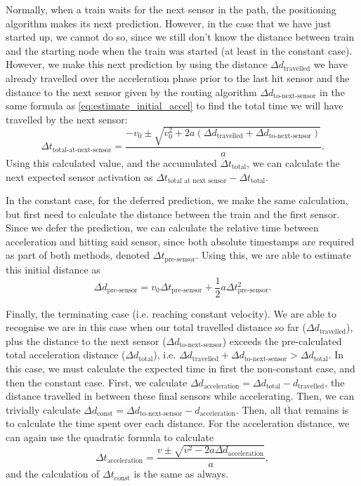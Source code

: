 \documentclass[12pt, titlepage]{article}
\begin{document}
    Normally, when a train waits for the next sensor in the path, the positioning algorithm makes its next prediction. However, in the case that we have just started up, we cannot do so, since we still don't know the distance between train and the starting node when the train was started (at least in the constant case). However, we make this next prediction by using the distance $\Delta d_\text{travelled}$ we have already travelled over the acceleration phase prior to the last hit sensor and the distance to the next sensor given by the routing algorithm $\Delta d_\text{to-next-sensor}$ in the same formula as \eqref{eq:estimate_initial_accel} to find the total time we will have travelled by the next sensor:
    \[
        \Delta t_\text{total-at-next-sensor} = \frac{-v_0 \pm \sqrt{v_0^2 + 2a(\Delta d_\text{travelled} + \Delta d_\text{to-next-sensor})}}{a}.
    \]
    Using this calculated value, and the accumulated $\Delta t_\text{total}$, we can calculate the next expected sensor activation as $\Delta t_\text{total at next sensor} - \Delta t_\text{total}$.
    
    In the constant case, for the deferred prediction, we make the same calculation, but first need to calculate the distance between the train and the first sensor. Since we defer the prediction, we can calculate the relative time between acceleration and hitting said sensor, since both absolute timestamps are required as part of both methods, denoted $\Delta t_\text{pre-sensor}$. Using this, we are able to estimate this initial distance as
    \[
        \Delta d_\text{pre-sensor} = v_0 \Delta t_\text{pre-sensor} + \frac{1}{2} a \Delta t_\text{pre-sensor}^2.
    \]
    
    Finally, the terminating case (i.e. reaching constant velocity). We are able to recognise we are in this case when our total travelled distance so far ($\Delta d_\text{travelled}$), plus the distance to the next sensor ($\Delta d_\text{to-next-sensor}$) exceeds the pre-calculated total acceleration distance ($\Delta d_\text{total}$), i.e. $\Delta d_\text{travelled} + \Delta d_\text{to-next-sensor} > \Delta d_\text{total}$. In this case, we must calculate the expected time in first the non-constant case, and then the constant case. First, we calculate $\Delta d_\text{acceleration} = \Delta d_\text{total} - d_\text{travelled}$, the distance travelled in between these final sensors while accelerating. Then, we can trivially calculate $\Delta d_\text{const} = \Delta d_\text{to-next-sensor} - d_\text{acceleration}$. Then, all that remains is to calculate the time spent over each distance. For the acceleration distance, we can again use the quadratic formula to calculate
    \[
        \Delta t_\text{acceleration} = \frac{v \pm \sqrt{v^2 - 2a\Delta d_\text{acceleration}}}{a},
    \]
    and the calculation of $\Delta t_\text{const}$ is the same as always.
    
\end{document}
